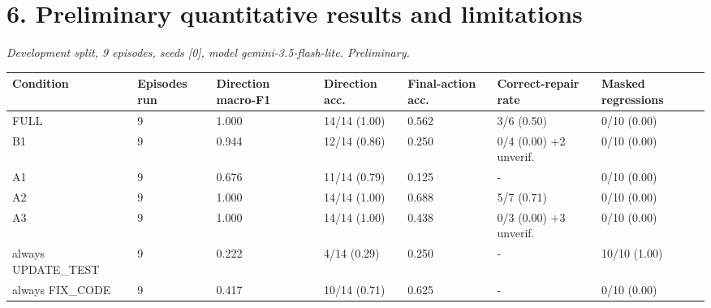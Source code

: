 \documentclass[10pt,a4paper]{article}
\begin{document}
\section*{6. Preliminary quantitative results and limitations}
{\small\itshape Development split, 9 episodes, seeds [0], model gemini-3.5-flash-lite. Preliminary.}\par\nopagebreak
\begin{longtable}{|>{\raggedright\arraybackslash\footnotesize}p{}>{\raggedright\arraybackslash\footnotesize}p{}>{\raggedright\arraybackslash\footnotesize}p{}>{\raggedright\arraybackslash\footnotesize}p{}>{\raggedright\arraybackslash\footnotesize}p{}>{\raggedright\arraybackslash\footnotesize}p{}>{\raggedright\arraybackslash\footnotesize}p{}|}
\hline
\textbf{Condition} & \textbf{Episodes run} & \textbf{Direction macro-F1} & \textbf{Direction acc.} & \textbf{Final-action acc.} & \textbf{Correct-repair rate} & \textbf{Masked regressions} \\ \hline\endhead
FULL & 9 & 1.000 & 14/14 (1.00) & 0.562 & 3/6 (0.50) & 0/10 (0.00) \\ \hline
B1 & 9 & 0.944 & 12/14 (0.86) & 0.250 & 0/4 (0.00) +2 unverif. & 0/10 (0.00) \\ \hline
A1 & 9 & 0.676 & 11/14 (0.79) & 0.125 & - & 0/10 (0.00) \\ \hline
A2 & 9 & 1.000 & 14/14 (1.00) & 0.688 & 5/7 (0.71) & 0/10 (0.00) \\ \hline
A3 & 9 & 1.000 & 14/14 (1.00) & 0.438 & 0/3 (0.00) +3 unverif. & 0/10 (0.00) \\ \hline
always UPDATE\_TEST & 9 & 0.222 & 4/14 (0.29) & 0.250 & - & 10/10 (1.00) \\ \hline
always FIX\_CODE & 9 & 0.417 & 10/14 (0.71) & 0.625 & - & 0/10 (0.00) \\ \hline
\end{longtable}
\end{document}
